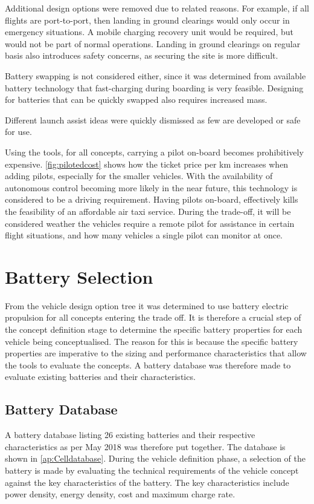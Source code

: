 Additional design options were removed due to related reasons. For example, if all flights are port-to-port, then landing in ground clearings would only occur in emergency situations. A mobile charging recovery unit would be required, but would not be part of normal operations. Landing in ground clearings on regular basis also introduces safety concerns, as securing the site is more difficult.

Battery swapping is not considered either, since it was determined from available battery technology that fast-charging during boarding is very feasible. Designing for batteries that can be quickly swapped also requires increased mass.

Different launch assist ideas were quickly dismissed as few are developed or safe for use.

Using the tools, for all concepts, carrying a pilot on-board becomes prohibitively expensive. \autoref{fig:pilotedcost} shows how the ticket price per km increases when adding pilots, especially for the smaller vehicles. With the availability of autonomous control becoming more likely in the near future, this technology is considered to be a driving requirement. Having pilots on-board, effectively kills the feasibility of an affordable air taxi service. During the trade-off, it will be considered weather the vehicles require a remote pilot for assistance in certain flight situations, and how many vehicles a single pilot can monitor at once.



\section{Battery Selection}
 From the vehicle design option tree it was determined to use battery electric propulsion for all concepts entering the trade off. It is therefore a crucial step of the concept definition stage to determine the specific battery properties for each vehicle being conceptualised. The reason for this is because the specific battery properties are imperative to the sizing and performance characteristics that allow the tools to evaluate the concepts. A battery database was therefore made to evaluate existing batteries and their characteristics.

 \subsection{Battery Database}
 A battery database listing 26 existing batteries and their respective characteristics as per May 2018 was therefore put together. The database is shown in \autoref{ap:Celldatabase}. During the vehicle definition phase, a selection of the battery is made by evaluating the technical requirements of the vehicle concept against the key characteristics of the battery. The key characteristics include power density, energy density, cost and maximum charge rate. 
